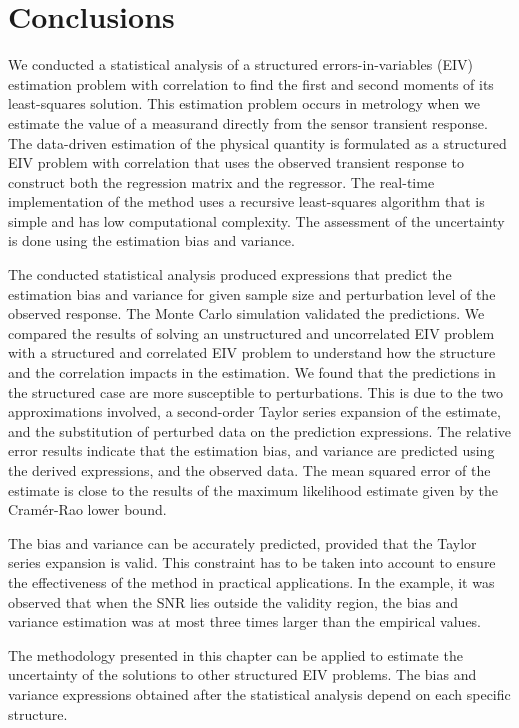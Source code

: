 \section{Conclusions}

 We conducted a statistical analysis of a structured errors-in-variables (EIV) estimation problem with correlation to find the first and second moments of its least-squares solution.
This estimation problem occurs in metrology when we estimate the value of a measurand directly from the sensor transient response.
The data-driven estimation of the physical quantity is formulated as a structured EIV problem with correlation that uses the observed transient response to construct both the regression matrix and the regressor.
The real-time implementation of the method uses a recursive least-squares algorithm that is simple and has low computational complexity.
The assessment of the uncertainty is done using the estimation bias and variance.

The conducted statistical analysis produced expressions that predict the estimation bias and variance for given sample size and perturbation level of the observed response.
The Monte Carlo simulation validated the predictions.
We compared the results of solving an unstructured and uncorrelated EIV problem with a structured and correlated EIV problem to understand how the structure and the correlation impacts in the estimation.
We found that the predictions in the structured case are more susceptible to perturbations.
This is due to the two approximations involved, a second-order Taylor series expansion of the estimate, and the substitution of perturbed data on the prediction expressions.
The relative error results indicate that the estimation bias, and variance are predicted using the derived expressions, and the observed data.
The mean squared error of the estimate is close to the results of the maximum likelihood estimate given by the Cram\'er-Rao lower bound.

The bias and variance can be accurately predicted, provided that the Taylor series expansion is valid.
This constraint has to be taken into account to ensure the effectiveness of the method in practical applications.
In the example, it was observed that when the SNR lies outside the validity region, the bias and variance estimation was at most three times larger than the empirical values.

The methodology presented in this chapter can be applied to estimate the uncertainty of the solutions to other structured EIV problems.
The bias and variance expressions obtained after the statistical analysis depend on each specific structure.



